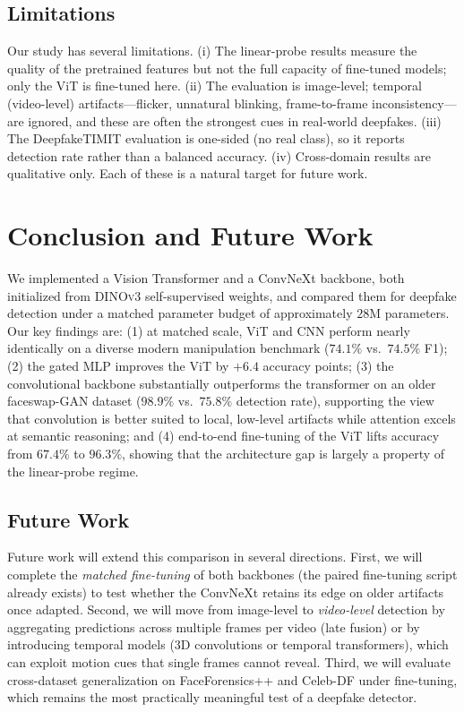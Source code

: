 \documentclass[11pt,a4paper]{article}
\begin{document}
\subsection{Limitations}
Our study has several limitations. (i) The linear-probe results measure the quality of the
pretrained features but not the full capacity of fine-tuned models; only the ViT is fine-tuned
here. (ii) The evaluation is image-level; temporal (video-level) artifacts---flicker, unnatural
blinking, frame-to-frame inconsistency---are ignored, and these are often the strongest cues in
real-world deepfakes. (iii) The DeepfakeTIMIT evaluation is one-sided (no real class), so it
reports detection rate rather than a balanced accuracy. (iv) Cross-domain results are qualitative
only. Each of these is a natural target for future work.

\section{Conclusion and Future Work}
We implemented a Vision Transformer and a ConvNeXt backbone, both initialized from \textsc{DINOv3}
self-supervised weights, and compared them for deepfake detection under a matched parameter budget
of approximately $28$M parameters. Our key findings are: (1) at matched scale, ViT and CNN perform
nearly identically on a diverse modern manipulation benchmark ($74.1\%$ vs.\ $74.5\%$ F1);
(2) the gated MLP improves the ViT by $+6.4$ accuracy points; (3) the convolutional backbone
substantially outperforms the transformer on an older faceswap-GAN dataset ($98.9\%$ vs.\ $75.8\%$
detection rate), supporting the view that convolution is better suited to local, low-level
artifacts while attention excels at semantic reasoning; and (4) end-to-end fine-tuning of the ViT
lifts accuracy from $67.4\%$ to $96.3\%$, showing that the architecture gap is largely a property
of the linear-probe regime.

\subsection{Future Work}\label{sec:future}
Future work will extend this comparison in several directions. First, we will complete the
\emph{matched fine-tuning} of both backbones (the paired fine-tuning script already exists) to
test whether the ConvNeXt retains its edge on older artifacts once adapted. Second, we will move
from image-level to \emph{video-level} detection by aggregating predictions across multiple frames
per video (late fusion) or by introducing temporal models (3D convolutions or temporal
transformers), which can exploit motion cues that single frames cannot reveal. Third, we will
evaluate cross-dataset generalization on FaceForensics++ and Celeb-DF under fine-tuning, which
remains the most practically meaningful test of a deepfake detector.
\end{document}
